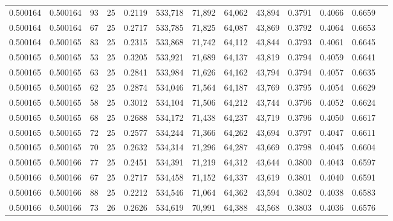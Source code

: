 \begin{tabular}{rrrrrrrrrrrrr}
0.500164 & 0.500164 &    93 &  25 &                                     0.2119 & 533,718 &  71,892 &  64,062 &  43,894 & 0.3791 & 0.4066 & 0.6659 \\
0.500164 & 0.500164 &    67 &  25 &                                     0.2717 & 533,785 &  71,825 &  64,087 &  43,869 & 0.3792 & 0.4064 & 0.6653 \\
0.500164 & 0.500165 &    83 &  25 &                                     0.2315 & 533,868 &  71,742 &  64,112 &  43,844 & 0.3793 & 0.4061 & 0.6645 \\
0.500165 & 0.500165 &    53 &  25 &                                     0.3205 & 533,921 &  71,689 &  64,137 &  43,819 & 0.3794 & 0.4059 & 0.6641 \\
0.500165 & 0.500165 &    63 &  25 &                                     0.2841 & 533,984 &  71,626 &  64,162 &  43,794 & 0.3794 & 0.4057 & 0.6635 \\
0.500165 & 0.500165 &    62 &  25 &                                     0.2874 & 534,046 &  71,564 &  64,187 &  43,769 & 0.3795 & 0.4054 & 0.6629 \\
0.500165 & 0.500165 &    58 &  25 &                                     0.3012 & 534,104 &  71,506 &  64,212 &  43,744 & 0.3796 & 0.4052 & 0.6624 \\
0.500165 & 0.500165 &    68 &  25 &                                     0.2688 & 534,172 &  71,438 &  64,237 &  43,719 & 0.3796 & 0.4050 & 0.6617 \\
0.500165 & 0.500165 &    72 &  25 &                                     0.2577 & 534,244 &  71,366 &  64,262 &  43,694 & 0.3797 & 0.4047 & 0.6611 \\
0.500165 & 0.500165 &    70 &  25 &                                     0.2632 & 534,314 &  71,296 &  64,287 &  43,669 & 0.3798 & 0.4045 & 0.6604 \\
0.500165 & 0.500166 &    77 &  25 &                                     0.2451 & 534,391 &  71,219 &  64,312 &  43,644 & 0.3800 & 0.4043 & 0.6597 \\
0.500166 & 0.500166 &    67 &  25 &                                     0.2717 & 534,458 &  71,152 &  64,337 &  43,619 & 0.3801 & 0.4040 & 0.6591 \\
0.500166 & 0.500166 &    88 &  25 &                                     0.2212 & 534,546 &  71,064 &  64,362 &  43,594 & 0.3802 & 0.4038 & 0.6583 \\
0.500166 & 0.500166 &    73 &  26 &                                     0.2626 & 534,619 &  70,991 &  64,388 &  43,568 & 0.3803 & 0.4036 & 0.6576 \\

\end{tabular}
